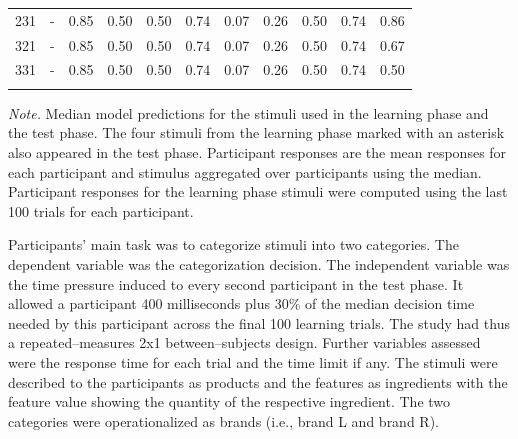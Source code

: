 \documentclass[a4paper,man,natbib]{apa6}
\begin{document}
\begin{table}
\begin{center}
\begin{threeparttable}
\begin{tabular}{ccccccccccc}
231 & - & 0.85 & 0.50 & 0.50 & 0.74 & 0.07 & 0.26 & 0.50 & 0.74 & 0.86\\
321 & - & 0.85 & 0.50 & 0.50 & 0.74 & 0.07 & 0.26 & 0.50 & 0.74 & 0.67\\
331 & - & 0.85 & 0.50 & 0.50 & 0.74 & 0.07 & 0.26 & 0.50 & 0.74 & 0.50\\
\bottomrule
\addlinespace
\end{tabular}
\begin{tablenotes}[para]
\textit{Note.} Median model predictions for the stimuli used in the learning phase and the test phase. The four stimuli from the learning phase marked with an asterisk also appeared in the test phase. Participant responses are the mean responses for each participant and stimulus aggregated over participants using the median. Participant responses for the learning phase stimuli were computed using the last 100 trials for each participant.
\end{tablenotes}
\end{threeparttable}
\end{center}
\end{table}

Participants' main task was to categorize stimuli into two categories. The dependent variable was the categorization decision. The independent variable was the time pressure induced to every second participant in the test phase. It allowed a participant 400 milliseconds plus 30\% of the median decision time needed by this participant across the final 100 learning trials. The study had thus a repeated--measures 2x1 between--subjects design. Further variables assessed were the response time for each trial and the time limit if any. The stimuli were described to the participants as products and the features as ingredients with the feature value showing the quantity of the respective ingredient. The two categories were operationalized as brands (i.e., brand L and brand R). 
\end{document}
